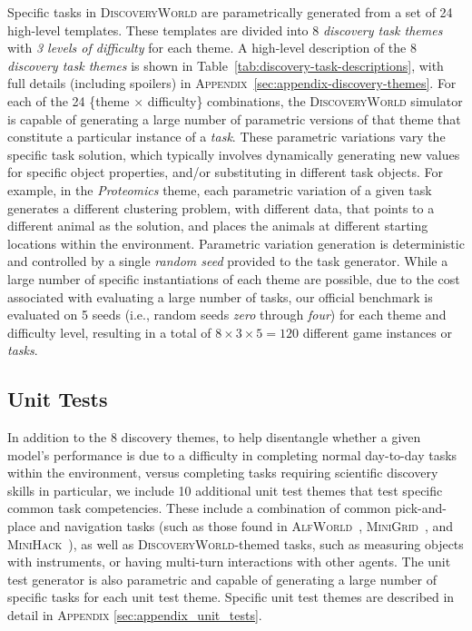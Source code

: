 \documentclass{article}
\newcommand{\env}{\textsc{DiscoveryWorld}\xspace}
\begin{document}
Specific tasks in \env are parametrically generated from a set of 24 high-level templates.  These templates are divided into 8 \textit{discovery task themes} with \textit{3 levels of difficulty} for each theme.  
A high-level description of the 8 \textit{discovery task themes} is shown in Table~\ref{tab:discovery-task-descriptions}, with full details (including spoilers) in \textsc{Appendix}~\ref{sec:appendix-discovery-themes}. 
For each of the 24 \{theme $\times$ difficulty\} combinations, the \env simulator is capable of generating a large number of parametric versions of that theme that constitute a particular instance of a \textit{task}.  These parametric variations vary the specific task solution, which typically involves dynamically generating new values for specific object properties, and/or substituting in different task objects.  For example, in the \textit{Proteomics} theme, each parametric variation of a given task generates a different clustering problem, with different data, that points to a different animal as the solution, and places the animals at different starting locations within the environment. %
Parametric variation generation is deterministic and controlled by a single \textit{random seed} provided to the task generator.  While a large number of specific instantiations of each theme are possible, due to the cost associated with evaluating a large number of tasks, our official benchmark is evaluated on 5 seeds (i.e., random seeds \textit{zero} through \textit{four}) for each theme and difficulty level, resulting in a total of $8\times3\times5=120$ different game instances or \textit{tasks}. 













\subsection{Unit Tests}

In addition to the 8 discovery themes, to help disentangle whether a given model's performance is due to a difficulty in completing normal day-to-day tasks within the environment, versus completing tasks requiring scientific discovery skills in particular, we include 10 additional unit test themes that test specific common task competencies.  These include a combination of common pick-and-place and navigation tasks (such as those found in \textsc{AlfWorld}~\citep{Shridhar2020ALFWorldAT}, \textsc{MiniGrid}~\citep{MinigridMiniworld23}, and \textsc{MiniHack}~\citep{Samvelyan2021MiniHackTP}), as well as \env-themed tasks, such as measuring objects with instruments, or having multi-turn interactions with other agents.  The unit test generator is also parametric and capable of generating a large number of specific tasks for each unit test theme.  Specific unit test themes are described in detail in \textsc{Appendix} \ref{sec:appendix_unit_tests}.
\end{document}
